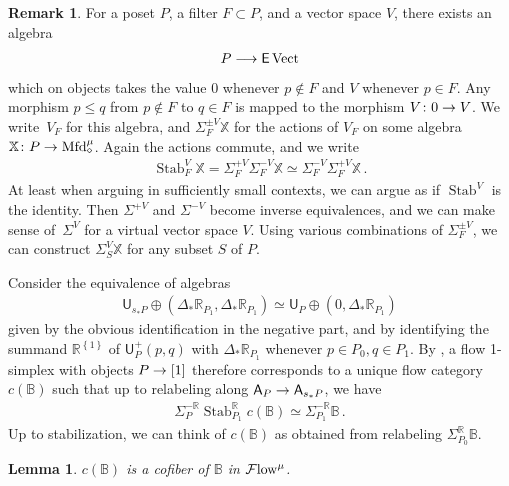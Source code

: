 \documentclass[10pt]{amsart}
\numberwithin{equation}{section}
\newtheorem{lem}[prop]{Lemma}
\theoremstyle{definition}
\newtheorem{rem}[prop]{Remark}
\DeclareMathOperator{\Stab}{Stab}
\DeclareMathOperator{\Vect}{Vect}
\newcommand{\Flow}{\cF\mathrm{low}\vphantom{w}}
\newcommand{\Mfd}{\mathrm{Mfd}\vphantom{d}}
\newcommand{\bB}{\mathbb{B}}
\newcommand{\bR}{\mathbb{R}}
\newcommand{\bX}{\mathbb{X}}
\newcommand{\cF}{\mathcal{F}}
\newcommand{\sfA}{\mathsf{A}}
\newcommand{\sfE}{\mathsf{E}}
\newcommand{\sfU}{\mathsf{U}}
\renewcommand{\to}{\mathchoice{\longrightarrow}{\rightarrow}{}{}}
\begin{document}
\begin{rem}
	For a poset $P$, a filter $F\subset P$, and a vector space $V$, there exists an algebra
	\begin{align*}
		P \to \sfE\Vect
	\end{align*}
	which on objects takes the value 0 whenever $p\notin F$ and $V$ whenever $p\in F$.
  Any morphism $p\leq q$ from $p\notin F$ to $q\in F$ is mapped to the morphism $V\colon 0\to V$.
  We write~$V_{F}$ for this algebra, and $\Sigma_{F}^{\pm V}\bX$ for the actions of $V_{F}$ on some algebra $\bX\colon P \to \Mfd_{\diamond}^{\mu}$.
  Again the actions commute, and we write
	\begin{align*}
		\Stab^{V}_{F}\bX = \Sigma^{+V}_{F}\Sigma^{-V}_{F}\bX  \simeq \Sigma^{-V}_{F}\Sigma^{+V}_{F} \bX \,.
	\end{align*}
	At least when arguing in sufficiently small contexts, we can argue as if $\Stab^{V}$ is the identity.
  Then $\Sigma^{+V}$ and $\Sigma^{-V}$ become inverse equivalences, and we can make sense of~$\Sigma^{V}$ for a virtual vector space $V$.
  Using various combinations of $\Sigma_{F}^{\pm V}$, we can construct $\Sigma^{V}_{S}\bX$ for any subset $S$ of $P$.
\end{rem}


Consider the equivalence of algebras
\begin{align*}
	\sfU_{s_{*}P} \oplus (\Delta_{*}\bR_{P_{1}}, \Delta_{*}\bR_{P_{1}} ) \simeq \sfU_{P} \oplus (0, \Delta_{*} \bR_{P_{1}})
\end{align*}
given by the obvious identification in the negative part, and by identifying the summand $\bR^{ \left\{ 1\right\}} $ of $\sfU^{+}_{P}(p,q)$ with $\Delta_{*}\bR_{P_{1}}$ whenever $p\in P_0, q\in P_1$.
By , a flow 1-simplex with objects $P\to [1]$ therefore corresponds to a unique flow category $c(\bB)$ such that up to relabeling along $\sfA_{P}\to \sfA_{s_{*}P}$, we have
\begin{align*}
	\Sigma_{P}^{-\bR}\Stab_{P_{1}}^{\bR} c(\bB) \simeq \Sigma^{-\bR}_{P_{1}} \bB \,.
\end{align*}
Up to stabilization, we can think of $c(\bB)$ as obtained from relabeling $\Sigma^{\bR}_{P_{0}} \bB$.


\begin{lem}\label{lem:cofibers_in_flow}
	$c(\bB)$ is a cofiber of $\bB$ in $\Flow^{\mu}$.
\end{lem}
\end{document}
